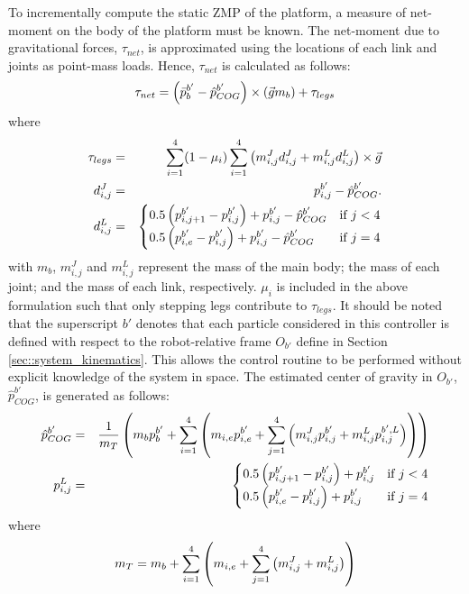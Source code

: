 		To incrementally compute the static ZMP of the platform, a measure of net-moment on the body of the platform must be known. The net-moment due to gravitational forces, $\tau_{net}$, is approximated using the locations of each link and joints as point-mass loads. Hence, $\tau_{net}$ is calculated as follows:
			\begin{equation}
				\tau_{net} 	=  \left(\bar{p}_{b}^{b'}-\hat{p}_{COG}^{b'} \right) \times \left(\vec{g} m_{b}\right)	+ \tau_{legs}
				\label{eq::net_moment}
			\end{equation}
		where
			\begin{eqnarray*}
					\tau_{legs}		& = & \sum_{i=1}^{4} (1-\mu_{i})  \sum_{i=1}^{4}   \left( m_{i,j}^{J} d_{i,j}^{J} + m_{i,j}^{L} d_{i,j}^{L} \right)	\times \vec{g} \nonumber \\
					d_{i,j}^{J} 	& = & {{p}_{i,j}^{b'}-\hat{p}_{COG}^{b'}.} \nonumber \\														
					d_{i,j}^{L} 	& = &
					\begin{cases}
					{ 0.5  \left({p}_{i,j+1}^{b'}-{p}_{i,j}^{b'}\right) + {p}_{i,j}^{b'} - \hat{p}_{COG}^{b'}} 	&\text{if } j < 4 \\
					{ 0.5  \left({p}_{i,e}^{b'}-{p}_{i,j}^{b'}\right) + {p}_{i,j}^{b'} - \hat{p}_{COG}^{b'}} 		&\text{if } j = 4
					\end{cases} \nonumber
				\label{eq::Levers}
			\end{eqnarray*}
		with $m_{b}$, $m_{i,j}^{J}$ and $m_{i,j}^{L}$ represent the mass of the main body; the mass of each joint; and the mass of each link, respectively. $\mu_{i}$ is included in the above formulation such that only stepping legs contribute to  $\tau_{legs}$. It should be noted that the superscript ${b'}$ denotes that each particle considered in this controller is defined with respect to the robot-relative frame $O_{b'}$ define in Section \ref{sec::system_kinematics}. This allows the control routine to be performed without explicit knowledge of the system in space. The estimated center of gravity in $O_{b'}$, $\hat{p}_{COG}^{b'}$, is generated as follows:
			\begin{eqnarray*}
				\hat{p}_{COG}^{b'} 	& = & \frac{1}{m_{T}}\left( m_{b}p_{b}^{b'} + \sum_{i=1}^{4} \left(m_{i,e}{p}_{i,e}^{b'} + \sum_{j=1}^{4} \left(  m_{i,j}^{J}{p}_{i,j}^{b'} +  m_{i,j}^{L}{p}_{i,j}^{b',L} \right) \right)\right) 	\nonumber \\
				{p}_{i,j}^{L} 	& = & 
					\begin{cases}
					{ 0.5  \left({p}_{i,j+1}^{b'}-{p}_{i,j}^{b'}\right) + {p}_{i,j}^{b'} } 	&\text{if } j < 4 \\
					{ 0.5  \left({p}_{i,e}^{b'}-{p}_{i,j}^{b'}\right) + {p}_{i,j}^{b'} } 		&\text{if } j = 4
					\end{cases} \nonumber
				\label{eq::cog_estimate}
			\end{eqnarray*}
		where
			\begin{equation}
				m_{T} = m_{b} + \sum_{i=1}^{4} \left(m_{i,e} + \sum_{j=1}^{4} \left(  m_{i,j}^{J} +  m_{i,j}^{L} \right) \right)
			\end{equation}

